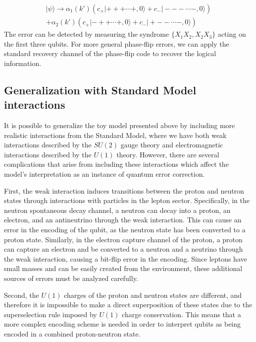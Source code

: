 \documentclass[11pt,english]{article}
\begin{document}
\begin{equation}
\begin{split}
   |\psi\rangle \rightarrow \alpha_1(k')(c_{+}|+++\cdots+,0\rangle+c_{-}|---\cdots-,0\rangle)\\
    +\alpha_2(k')(c_+|-++\cdots+,0\rangle+c_-|+--\cdots-,0\rangle)
 \end{split}
\end{equation}
The error can be detected by measuring the syndrome $\{X_1X_2, X_2X_3\}$ acting on the first three qubits. For more general phase-flip errors, we can apply the standard recovery channel of the phase-flip code to recover the logical information. 


\subsection{Generalization with Standard Model interactions }\label{SM}

It is possible to generalize the toy model presented above by including more realistic interactions from the Standard Model, where we have both weak interactions described by the $SU(2)$ gauge theory and electromagnetic interactions described by the $U(1)$ theory. However, there are several complications that arise from including these interactions which affect the model's interpretation as an instance of quantum error correction.

First, the weak interaction induces transitions between the proton and neutron states through interactions with particles in the lepton sector. Specifically, in the neutron spontaneous decay channel, a neutron can decay into a proton, an electron, and an antineutrino through the weak interaction. This can cause an error in the encoding of the qubit, as the neutron state has been converted to a proton state. Similarly, in the electron capture channel of the proton, a proton can capture an electron and be converted to a neutron and a neutrino through the weak interaction, causing a bit-flip error in the encoding. Since leptons have small masses and can be easily created from the environment, these additional sources of errors must be analyzed carefully. 

Second, the $U(1)$ charges of the proton and neutron states are different, and therefore it is impossible to make a direct superposition of these states due to the superselection rule imposed by $U(1)$ charge conservation. This means that a more complex encoding scheme is needed in order to interpret qubits as being encoded in a combined proton-neutron state. 
\end{document}
